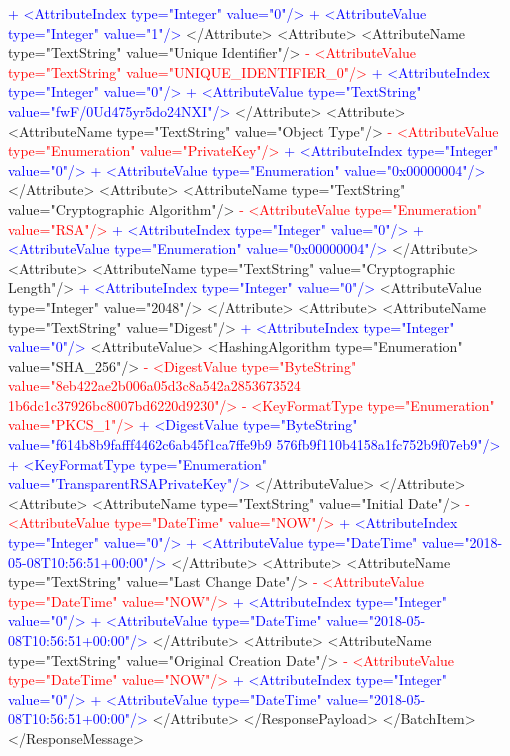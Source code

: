 \textcolor{blue}{+        <AttributeIndex type="Integer" value="0"/>}
\textcolor{blue}{+        <AttributeValue type="Integer" value="1"/>}
       </Attribute>
       <Attribute>
         <AttributeName type="TextString" value="Unique Identifier"/>
\textcolor{red}{-        <AttributeValue type="TextString" value="UNIQUE_IDENTIFIER_0"/>}
\textcolor{blue}{+        <AttributeIndex type="Integer" value="0"/>}
\textcolor{blue}{+        <AttributeValue type="TextString" value="fwF/0Ud475yr5do24NXI"/>}
       </Attribute>
       <Attribute>
         <AttributeName type="TextString" value="Object Type"/>
\textcolor{red}{-        <AttributeValue type="Enumeration" value="PrivateKey"/>}
\textcolor{blue}{+        <AttributeIndex type="Integer" value="0"/>}
\textcolor{blue}{+        <AttributeValue type="Enumeration" value="0x00000004"/>}
       </Attribute>
       <Attribute>
         <AttributeName type="TextString" value="Cryptographic Algorithm"/>
\textcolor{red}{-        <AttributeValue type="Enumeration" value="RSA"/>}
\textcolor{blue}{+        <AttributeIndex type="Integer" value="0"/>}
\textcolor{blue}{+        <AttributeValue type="Enumeration" value="0x00000004"/>}
       </Attribute>
       <Attribute>
         <AttributeName type="TextString" value="Cryptographic Length"/>
\textcolor{blue}{+        <AttributeIndex type="Integer" value="0"/>}
         <AttributeValue type="Integer" value="2048"/>
       </Attribute>
       <Attribute>
         <AttributeName type="TextString" value="Digest"/>
\textcolor{blue}{+        <AttributeIndex type="Integer" value="0"/>}
         <AttributeValue>
           <HashingAlgorithm type="Enumeration" value="SHA_256"/>
\textcolor{red}{-          <DigestValue type="ByteString" value="8eb422ae2b006a05d3c8a542a2853673524
1b6dc1c37926bc8007bd6220d9230"/>}
\textcolor{red}{-          <KeyFormatType type="Enumeration" value="PKCS_1"/>}
\textcolor{blue}{+          <DigestValue type="ByteString" value="f614b8b9fafff4462c6ab45f1ca7ffe9b9
576fb9f110b4158a1fc752b9f07eb9"/>}
\textcolor{blue}{+          <KeyFormatType type="Enumeration" value="TransparentRSAPrivateKey"/>}
         </AttributeValue>
       </Attribute>
       <Attribute>
         <AttributeName type="TextString" value="Initial Date"/>
\textcolor{red}{-        <AttributeValue type="DateTime" value="NOW"/>}
\textcolor{blue}{+        <AttributeIndex type="Integer" value="0"/>}
\textcolor{blue}{+        <AttributeValue type="DateTime" value="2018-05-08T10:56:51+00:00"/>}
       </Attribute>
       <Attribute>
         <AttributeName type="TextString" value="Last Change Date"/>
\textcolor{red}{-        <AttributeValue type="DateTime" value="NOW"/>}
\textcolor{blue}{+        <AttributeIndex type="Integer" value="0"/>}
\textcolor{blue}{+        <AttributeValue type="DateTime" value="2018-05-08T10:56:51+00:00"/>}
       </Attribute>
       <Attribute>
         <AttributeName type="TextString" value="Original Creation Date"/>
\textcolor{red}{-        <AttributeValue type="DateTime" value="NOW"/>}
\textcolor{blue}{+        <AttributeIndex type="Integer" value="0"/>}
\textcolor{blue}{+        <AttributeValue type="DateTime" value="2018-05-08T10:56:51+00:00"/>}
       </Attribute>
     </ResponsePayload>
   </BatchItem>
 </ResponseMessage>
 
